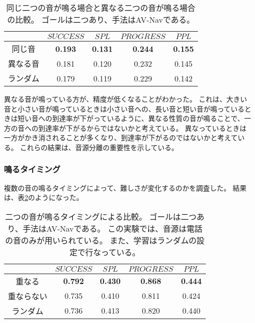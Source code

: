 \begin{table}[tb]
    \centering
    \caption{
        同じ二つの音が鳴る場合と異なる二つの音が鳴る場合の比較。
        ゴールは二つあり、手法はAV-Nav\cite{chen2020soundspaces}である。
    }
    \label{tab:same_and_different_sound}
    \begin{tabular}{@{}ccccc@{}}
    \toprule
        & $SUCCESS$ & $SPL$ & $PROGRESS$ & $PPL$  \\ \midrule
        同じ音 & \textbf{0.193} & \textbf{0.131} & \textbf{0.244} & \textbf{0.155} \\
        異なる音 & 0.181 & 0.120 & 0.232 & 0.145 \\
        ランダム & 0.179 & 0.119 & 0.229 & 0.142 \\ \bottomrule
        \end{tabular}
\end{table}

異なる音が鳴っている方が、精度が低くなることがわかった。
これは、大きい音と小さい音が鳴っているときは小さい音への、長い音と短い音が鳴っているときは短い音への到達率が下がっているように、異なる性質の音が鳴ることで、一方の音への到達率が下がるからではないかと考えている。
異なっているときは一方がかき消されることが多くなり、到達率が下がるのではないかと考えている。
これらの結果は、音源分離の重要性を示している。




\subsubsection{鳴るタイミング}

複数の音の鳴るタイミングによって、難しさが変化するのかを調査した。
結果は、表\ref{tab:sound_timing}のようになった。

\begin{table}[tb]
    \centering
    \caption{
        二つの音が鳴るタイミングによる比較。
        ゴールは二つあり、手法はAV-Nav\cite{chen2020soundspaces}である。
        この実験では、音源は電話の音のみが用いられている。
        また、学習はランダムの設定で行なっている。
    }
    \label{tab:sound_timing}
    \begin{tabular}{@{}ccccc@{}}
    \toprule
        & $SUCCESS$ & $SPL$ & $PROGRESS$ & $PPL$ \\ \midrule
        重なる & \textbf{0.792} & \textbf{0.430} & \textbf{0.868} & \textbf{0.444} \\
        重ならない & 0.735 & 0.410 & 0.811 & 0.424 \\
        ランダム & 0.736 & 0.413 & 0.820 & 0.440 \\ \bottomrule
    \end{tabular}
\end{table}

